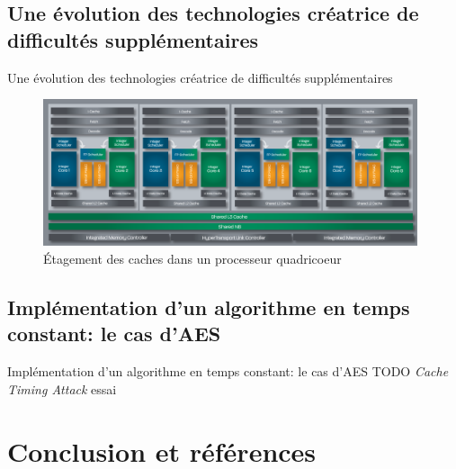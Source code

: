 \documentclass[11pt]{beamer}
\begin{document}
\subsection{Une évolution des technologies créatrice de difficultés supplémentaires}
\begin{frame}{Une évolution des technologies créatrice de difficultés supplémentaires}
\begin{figure}[h]
  \centering
  \includegraphics[width=11cm]{figures/BDArch.png}
  \caption{Étagement des caches dans un processeur quadricoeur}
  \label{etagement} 
\end{figure}
\end{frame}

\subsection{Implémentation d'un algorithme en temps constant: le cas d'AES}
\begin{frame}{Implémentation d'un algorithme en temps constant: le cas d'AES}
TODO \emph{Cache Timing Attack} essai~\cite{canteaut2006understanding}
\end{frame}

\section*{Conclusion et  références}
\end{document}
